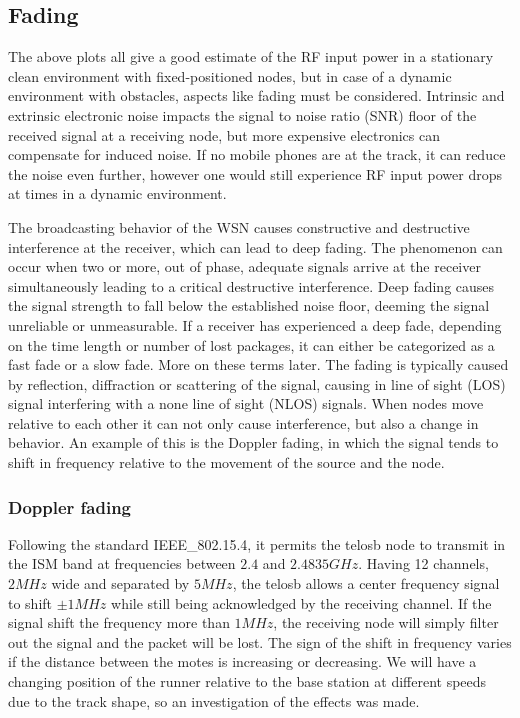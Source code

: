 \subsection{Fading}\label{sc:fading}

The above plots all give a good estimate of the RF input power in a stationary clean environment with fixed-positioned nodes, but in case of a dynamic environment with obstacles, aspects like fading must be considered. Intrinsic and extrinsic electronic noise impacts the signal to noise ratio (SNR) floor of the received signal at a receiving node, but more expensive electronics can compensate for induced noise. If no mobile phones are at the track, it can reduce the noise even further, however one would still experience RF input power drops at times in a dynamic environment.

\noindent The broadcasting behavior of the WSN causes constructive and destructive interference at the receiver, which can lead to deep fading. The phenomenon can occur when two or more, out of phase, adequate signals arrive at the receiver simultaneously leading to a critical destructive interference. Deep fading causes the signal strength to fall below the established noise floor, deeming the signal unreliable or unmeasurable. If a receiver has experienced a deep fade, depending on the time length or number of lost packages, it can either be categorized as a fast fade or a slow fade. More on these terms later. The fading is typically caused by reflection, diffraction or scattering of the signal, causing in line of sight (LOS) signal interfering with a none line of sight (NLOS) signals. When nodes move relative to each other it can not only cause interference, but also a change in behavior. An example of this is the Doppler fading, in which the signal tends to shift in frequency relative to the movement of the source and the node.

\subsubsection{Doppler fading}
Following the standard IEEE\_802.15.4, it permits the telosb node to transmit in the ISM band at frequencies between $2.4$ and $2.4835 GHz$. Having 12 channels, $2 MHz$ wide and separated by $5 MHz$, the telosb allows a center frequency signal to shift $\pm 1 MHz$ while still being acknowledged by the receiving channel. If the signal shift the frequency more than $1 MHz$, the receiving node will simply filter out the signal and the packet will be lost. The sign of the shift in frequency varies if the distance between the motes is increasing or decreasing. We will have a changing position of the runner relative to the base station at different speeds due to the track shape, so an investigation of the effects was made.


